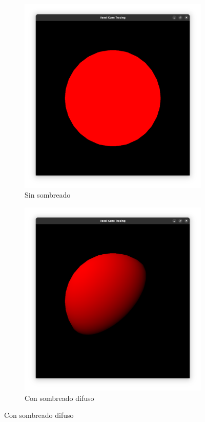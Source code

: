 \begin{figure}
    \begin{center}

    \begin{subfigure}{.49\textwidth}
        \includegraphics[width=\textwidth]{sphere-unshaded.png}
        \caption{Sin sombreado}
    \end{subfigure}

    \begin{subfigure}{.49\textwidth}
        \includegraphics[width=\textwidth]{sphere-diffuse.png}
        \caption{Con sombreado difuso}
    \end{subfigure}


\end{center}
\end{figure}
